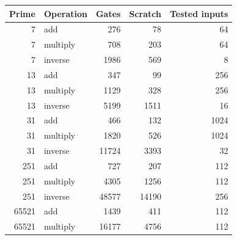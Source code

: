 \begin{tabular}{rlrrr}\toprule Prime & Operation & Gates & Scratch & Tested inputs\\\midrule
7 & add & 276 & 78 & 64\\
7 & multiply & 708 & 203 & 64\\
7 & inverse & 1986 & 569 & 8\\
13 & add & 347 & 99 & 256\\
13 & multiply & 1129 & 328 & 256\\
13 & inverse & 5199 & 1511 & 16\\
31 & add & 466 & 132 & 1024\\
31 & multiply & 1820 & 526 & 1024\\
31 & inverse & 11724 & 3393 & 32\\
251 & add & 727 & 207 & 112\\
251 & multiply & 4305 & 1256 & 112\\
251 & inverse & 48577 & 14190 & 256\\
65521 & add & 1439 & 411 & 112\\
65521 & multiply & 16177 & 4756 & 112\\
\bottomrule\end{tabular}
